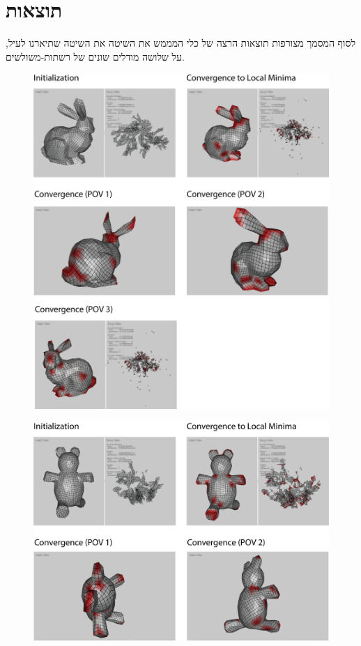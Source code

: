 \documentclass{article}
\begin{document}
\section{תוצאות}
לסוף המסמך מצורפות תוצאות הרצה של כלי המממש את השיטה את השיטה שתיארנו לעיל, על שלושה מודלים שונים של רשתות-משולשים.
\newpage
{}
\begin{figure}[ht]
\centering
\includegraphics[width=14cm]{bunny.png}
\end{figure}
\newpage
{}
\begin{figure}[ht]
\centering
\includegraphics[width=14cm]{teddy.png}
\end{figure}
\end{document}

